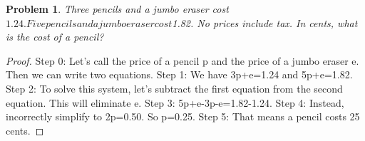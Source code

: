 \documentclass{article}
\newtheorem{theorem}{Problem}
\begin{document}
\begin{theorem}
Three pencils and a jumbo eraser cost $1.24. Five pencils and a jumbo eraser cost $1.82. No prices include tax. In cents, what is the cost of a pencil?
\end{theorem}

\begin{proof}
Step 0: Let's call the price of a pencil p and the price of a jumbo eraser e. Then we can write two equations.
Step 1: We have 3p+e=1.24 and 5p+e=1.82.
Step 2: To solve this system, let's subtract the first equation from the second equation. This will eliminate e.
Step 3: 5p+e-3p-e=1.82-1.24.
Step 4: Instead, incorrectly simplify to 2p=0.50. So p=0.25.
Step 5: That means a pencil costs 25 cents.
\end{proof}
\end{document}
